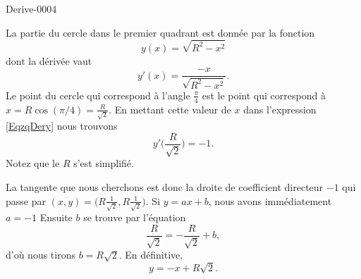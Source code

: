 
\begin{corrige}{Derive-0004}

	La partie du cercle dans le premier quadrant est donnée par la fonction
	\begin{equation}
		y(x)=\sqrt{R^2-x^2}
	\end{equation}
	dont la dérivée vaut
	\begin{equation}		\label{EqzqDery}
		y'(x)=\frac{ -x }{ \sqrt{R^2-x^2} }.
	\end{equation}
	Le point du cercle qui correspond à l'angle $\frac{ \pi }{ 4 }$ est le point qui correspond à $x=R\cos(\pi/4)=\frac{ R }{ \sqrt{2} }$. En mettant cette valeur de $x$ dans l'expression \eqref{EqzqDery} nous trouvons
	\begin{equation}
		y'\big( \frac{ R }{ \sqrt{2} } \big)=-1.
	\end{equation}
	Notez que le $R$ s'est simplifié.

	La tangente que nous cherchons est donc la droite de coefficient directeur $-1$ qui passe par $(x,y)=\big( R\frac{1}{ \sqrt{2} },R\frac{1}{ \sqrt{2} } \big)$. Si $y=ax+b$, nous avons immédiatement $a=-1$ Ensuite $b$ se trouve par l'équation
	\begin{equation}
		\frac{R}{ \sqrt{2} }=-\frac{R}{ \sqrt{2} }+b,
	\end{equation}
	d'où nous tirons $b=R\sqrt{2}$. En définitive,
	\begin{equation}
		y=-x+R\sqrt{2}.
	\end{equation}

\end{corrige}

